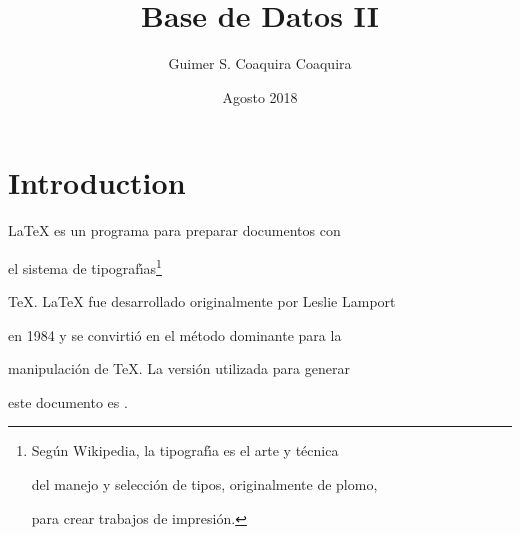 \documentclass{article}
\title{Base de Datos II}
\author{Guimer S. Coaquira Coaquira}
\date{Agosto 2018}
\begin{document}
\maketitle

\section{Introduction}


\maketitle \LaTeX{} es un programa para preparar documentos con

el sistema de tipograf\'{\i}as\footnote{%

           Seg\'un Wikipedia, la tipograf\'{\i}a es el arte y t\'ecnica

           del manejo y selecci\'on de tipos, originalmente de plomo,

           para crear trabajos de impresi\'on. } %

\TeX{}. \LaTeX{} fue desarrollado originalmente por Leslie Lamport

en 1984 y se convirti\'o en el m\'etodo dominante para la

manipulaci\'on de \TeX. La versi\'on utilizada para generar

este documento es \LaTeXe.

\newline
\end{document}
